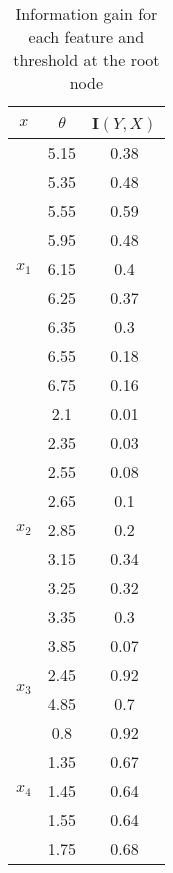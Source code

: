 \documentclass{article}
\begin{document}
\begin{table}[ht]
    \centering
    \caption{Information gain for each feature and threshold at the root node}
    \begin{tabular}{|c|c|c|}
        \hline $x$ & $\theta$ & I$(Y, X)$ \\ \hline
        \multirow{9}{*}{$x_1$} & 5.15 & 0.38 \\ \cline{2-3}
                               & 5.35 & 0.48 \\ \cline{2-3}
                               & 5.55 & 0.59 \\ \cline{2-3}
                               & 5.95 & 0.48 \\ \cline{2-3}
                               & 6.15 & 0.4 \\ \cline{2-3}
                               & 6.25 & 0.37 \\ \cline{2-3}
                               & 6.35 & 0.3 \\ \cline{2-3}
                               & 6.55 & 0.18 \\ \cline{2-3}
                               & 6.75 & 0.16 \\ \hline
        \multirow{9}{*}{$x_2$} & 2.1 & 0.01 \\ \cline{2-3}
                               & 2.35 & 0.03 \\ \cline{2-3}
                               & 2.55 & 0.08 \\ \cline{2-3}
                               & 2.65 & 0.1 \\ \cline{2-3}
                               & 2.85 & 0.2 \\ \cline{2-3}
                               & 3.15 & 0.34 \\ \cline{2-3}
                               & 3.25 & 0.32 \\ \cline{2-3}
                               & 3.35 & 0.3 \\ \cline{2-3}
                               & 3.85 & 0.07 \\ \hline
        \multirow{2}{*}{$x_3$} & 2.45 & 0.92 \\ \cline{2-3}
                               & 4.85 & 0.7 \\ \hline
        \multirow{5}{*}{$x_4$} & 0.8 & 0.92 \\ \cline{2-3}
                               & 1.35 & 0.67 \\ \cline{2-3}
                               & 1.45 & 0.64 \\ \cline{2-3}
                               & 1.55 & 0.64 \\ \cline{2-3}
                               & 1.75 & 0.68 \\ \hline
    \end{tabular}
\end{table}
\end{document}
